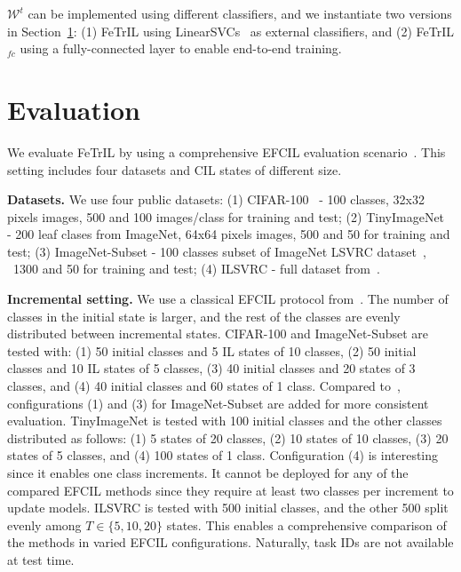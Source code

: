 \documentclass[10pt,twocolumn,letterpaper]{article}
\makeatletter
\newcommand{\ourmodel}{FeTrIL\@\xspace}
\newcommand{\ourmodelFc}{FeTrIL$_{fc}$\@\xspace}
\makeatother
\begin{document}
$\mathcal{W}^t$ can be implemented using different classifiers, and we instantiate two versions in Section~\ref{sec:evaluation}: 
(1) \ourmodel using LinearSVCs~\cite{fabian2012_scikitlearn} as external classifiers, 
and 
(2) \ourmodelFc using a fully-connected layer to enable end-to-end training. 

\section{Evaluation}
\label{sec:evaluation}
We evaluate \ourmodel by using a comprehensive EFCIL evaluation scenario~\cite{zhu2021class,zhu2021pass,zhu2022self}. 
This setting includes four datasets and CIL states of different size.

\textbf{Datasets.} We use four public datasets:
(1) CIFAR-100~\cite{krizhevsky2009_cifar100} - 100 classes, 32x32 pixels images, 500 and 100 images/class for training and test;
(2) TinyImageNet~\cite{le2015tiny} - 200 leaf clases from ImageNet, 64x64 pixels images, 500 and 50 for training and test;
(3) ImageNet-Subset - 100 classes subset of ImageNet LSVRC dataset~\cite{olga2015_ilsvrc}, ~1300 and 50 for training and test;
(4) ILSVRC - full dataset from~\cite{olga2015_ilsvrc}.

\textbf{Incremental setting.} We use a classical EFCIL protocol from~\cite{zhu2021class,zhu2021pass,zhu2022self}. 
The number of classes in the initial state is larger, and the rest of the classes are evenly distributed between incremental states. 
CIFAR-100 and ImageNet-Subset are tested with: (1) 50 initial classes and 5 IL states of 10 classes, (2) 50 initial classes and 10 IL states of 5 classes, (3) 40 initial classes and 20 states of 3 classes, and (4) 40 initial classes and 60 states of 1 class. 
Compared to~\cite{zhu2021class,zhu2021pass,zhu2022self}, configurations (1) and (3) for ImageNet-Subset are added for more consistent evaluation.
TinyImageNet is tested with 100 initial classes and the other classes distributed as follows: (1) 5 states of 20 classes, (2) 10 states of 10 classes, (3) 20 states of 5 classes, and (4) 100 states of 1 class.
Configuration (4) is interesting since it enables one class increments.
It cannot be deployed for any of the compared EFCIL methods since they require at least two classes per increment to update models. 
ILSVRC is tested with 500 initial classes, and the other 500 split evenly among $T\in \{5,10,20\}$ states.
This enables a comprehensive comparison of the methods in varied EFCIL configurations.
Naturally, task IDs are not available at test time. 
\end{document}
